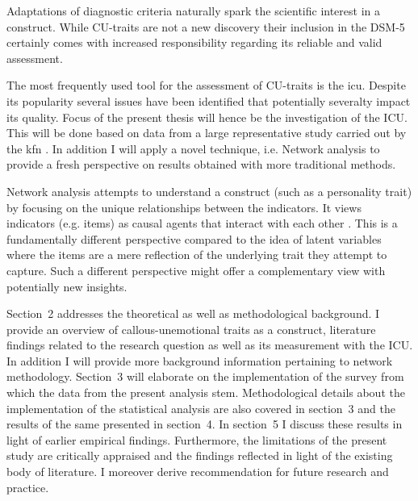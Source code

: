 Adaptations of diagnostic criteria naturally spark the scientific interest in a construct.
While CU-traits are not a new discovery their inclusion in the DSM-5 certainly comes with 
increased responsibility regarding its reliable and valid assessment.

The most frequently used tool for the assessment of CU-traits is the \gls{icu}.
Despite its popularity several issues have been identified that potentially severalty impact its quality.  
Focus of the present thesis will hence be the investigation of the ICU.
This will be done based on data from a large representative study carried out by the \gls{kfn} \parencite{bergmann_jugendliche_2017}.
In addition I will apply a novel technique, i.e. Network analysis to provide a fresh perspective on results obtained with more traditional methods. 

Network analysis attempts to understand a construct (such as a personality trait) by focusing on the unique relationships between the indicators. 
It views indicators (e.g. items) as causal agents that interact with each other \parencite{cramer_comorbidity_2010}. 
This is a fundamentally different perspective compared to the idea of latent variables where the items are a mere reflection of the underlying trait they attempt to capture. 
Such a different perspective might offer a complementary view with potentially new insights.

Section~2 addresses the theoretical as well as methodological background. 
I provide an overview of callous-unemotional traits as a construct, literature findings related to the research question as well as its measurement with the ICU. In addition I will provide more background information pertaining to network methodology.
Section~3 will elaborate on the implementation of the survey from which the data from the present analysis stem.
Methodological details about the implementation of the statistical analysis are also covered in section~3 and the results of the same presented in section~4.
In section~5 I discuss these results in light of earlier empirical findings. 
Furthermore, the limitations of the present study are critically appraised and the findings reflected in light of the existing body of literature. 
I moreover derive recommendation for future research and practice.